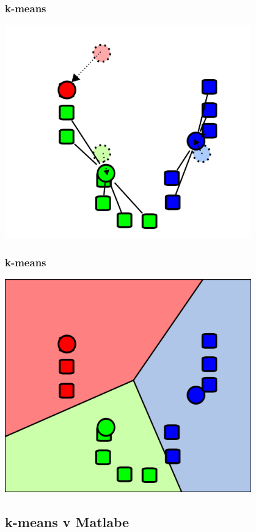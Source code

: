 \documentclass{beamer}
\begin{document}
\begin{frame}
\frametitle{k-means}
\begin{center}
\includegraphics[width=0.8\textwidth]{km3.png}
\end{center}
\end{frame}

\begin{frame}
\frametitle{k-means}
\begin{center}
\includegraphics[width=0.8\textwidth]{km4.png}
\end{center}
\end{frame}

\subsection{k-means v Matlabe}
\end{document}
